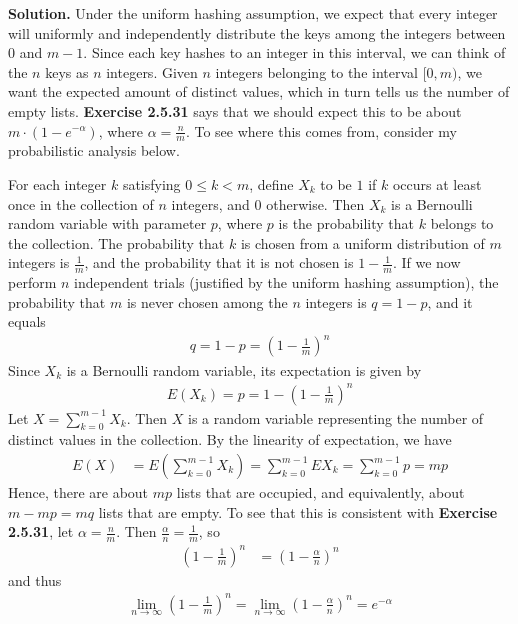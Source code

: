 \documentclass[12pt, a4paper]{article}
\newenvironment{sol}[1][Solution]
{\par\medskip\noindent \textbf{#1.} }
{\medskip}
\begin{document}
	\begin{sol}
		Under the uniform hashing assumption, we expect that every integer will uniformly
		and independently distribute the keys among the integers between $0$ and $m-1$.
		Since each key hashes to an integer in this interval, we can think of the $n$
		keys as $n$ integers. Given $n$ integers belonging to the interval $[0, m)$, we want
		the expected amount of distinct values, which in turn tells us the number of
		empty lists. \textbf{Exercise 2.5.31} says that we should expect this to be
		about $m\cdot (1-e^{-\alpha})$, where $\alpha=\frac{n}{m}$. To see where this
		comes from, consider my probabilistic analysis below.
		
		For each integer $k$ satisfying $0\leq k<m$, define $X_k$ to be $1$ if $k$ occurs
		at least once in the collection of $n$ integers, and $0$ otherwise. Then $X_k$
		is a Bernoulli random variable with parameter $p$, where $p$ is the probability
		that $k$ belongs to the collection. The probability that $k$ is chosen from
		a uniform distribution of $m$ integers is $\frac{1}{m}$, and the probability that
		it is not chosen is $1-\frac{1}{m}$. If we now perform $n$ independent trials
		(justified by the uniform hashing assumption), the probability that $m$
		is never chosen among the $n$ integers is $q=1-p$, and it equals
		\begin{align*}
			q=1-p=\left(1-\frac{1}{m}\right)^n
		\end{align*}
		Since $X_k$ is a Bernoulli random variable, its expectation is given by
		\begin{align*}
			E(X_k) = p= 1-\left(1-\frac{1}{m}\right)^n
		\end{align*}
		Let $X=\sum_{k=0}^{m-1}X_k$. Then $X$ is a random variable representing the number
		of distinct values in the collection. By the linearity of expectation, we have
		\begin{align*}
			E(X) &= E\left(\sum_{k=0}^{m-1}X_k\right)=\sum_{k=0}^{m-1}EX_k=\sum_{k=0}^{m-1}p=mp
		\end{align*}
		Hence, there are about $mp$ lists that are occupied, and equivalently, about $m-mp=mq$ lists
		that are empty. To see that this is consistent with \textbf{Exercise 2.5.31}, let
		$\alpha=\frac{n}{m}$. Then $\frac{\alpha}{n} = \frac{1}{m}$, so
		\begin{align*}
			\left(1-\frac{1}{m}\right)^n &= \left(1-\frac{\alpha}{n}\right)^n
		\end{align*}
		and thus
		\begin{align*}
			\lim_{n\to\infty}\left(1-\frac{1}{m}\right)^n=\lim_{n\to\infty}\left(1-\frac{\alpha}{n}\right)^n=e^{-\alpha}

\end{align*}
\end{sol}
\end{document}
